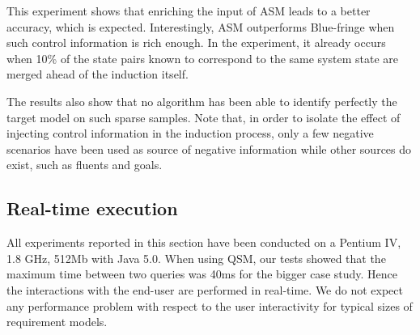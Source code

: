 This experiment shows that enriching the input of ASM leads to a better accuracy, which is expected. Interestingly, ASM outperforms Blue-fringe when such control information is rich enough. In the experiment, it already occurs when 10\% of the state pairs known to correspond to the same system state are merged ahead of the induction itself.

The results also show that no algorithm has been able to identify perfectly the target model on such sparse samples. Note that, in order to isolate the effect of injecting control information in the induction process, only a few negative scenarios have been used as source of negative information while other sources do exist, such as fluents and goals.


\subsection{Real-time execution}

All experiments reported in this section have been conducted on a Pentium IV, 1.8 GHz, 512Mb with Java 5.0. When using QSM, our tests showed that the maximum time between two queries was 40ms for the bigger case study. Hence the interactions with the end-user are performed in real-time. We do not expect any performance problem with respect to the user interactivity for typical sizes of requirement models.

